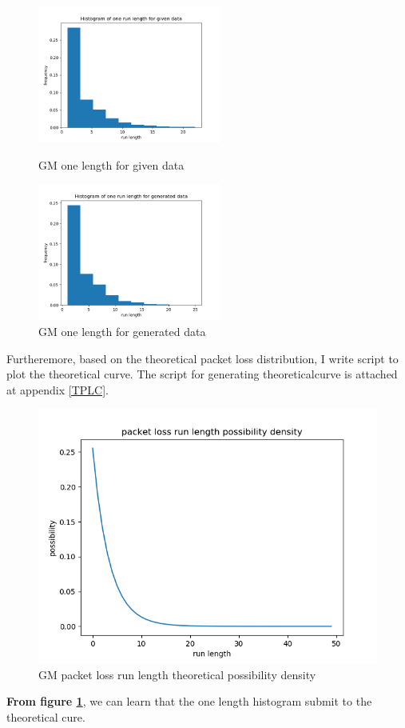\documentclass[11pt]{article}
\begin{document}
\begin{figure}[htbp]
    \centering
    \begin{minipage}[t]{0.48\textwidth}
    \centering
    \includegraphics[width=6cm]{GM_Histogram_of_one_run_length_for_given_data.png}
    \caption{GM one length for given data}
    \end{minipage}
    \begin{minipage}[t]{0.48\textwidth}
    \centering
    \includegraphics[width=6cm]{GM_Histogram_of_one_run_length_for_generated_data.png}
    \caption{GM one length for generated data}
    \end{minipage}
\end{figure}
Furtheremore, based on the theoretical packet loss distribution, I write script to plot the theoretical curve.
The  script  for  generating  theoreticalcurve is attached at appendix \ref{TPLC}.
\begin{figure}[htb]
    \centering
    \includegraphics[scale = 0.6]{GM_packet_loss_run_length_possibility_density.png}
    \caption{GM packet loss run length theoretical possibility density}
    \label{GMTD}
\end{figure}
\textbf{From figure \ref{GMTD}}, we can learn that the one length histogram submit to the theoretical cure.
\end{document}
